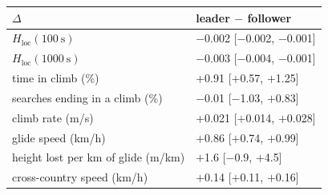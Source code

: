 \begin{tabular}{@{}l l@{}}
\toprule
$\Delta$ & leader $-$ follower \\
\midrule
$H_\mathrm{loc}(100~\mathrm{s})$ & $-$0.002 [$-$0.002, $-$0.001] \\
$H_\mathrm{loc}(1000~\mathrm{s})$ & $-$0.003 [$-$0.004, $-$0.001] \\
time in climb (\%) & $+$0.91 [$+$0.57, $+$1.25] \\
searches ending in a climb (\%) & $-$0.01 [$-$1.03, $+$0.83] \\
climb rate (m/s) & $+$0.021 [$+$0.014, $+$0.028] \\
glide speed (km/h) & $+$0.86 [$+$0.74, $+$0.99] \\
height lost per km of glide (m/km) & $+$1.6 [$-$0.9, $+$4.5] \\
cross-country speed (km/h) & $+$0.14 [$+$0.11, $+$0.16] \\
\bottomrule
\end{tabular}
